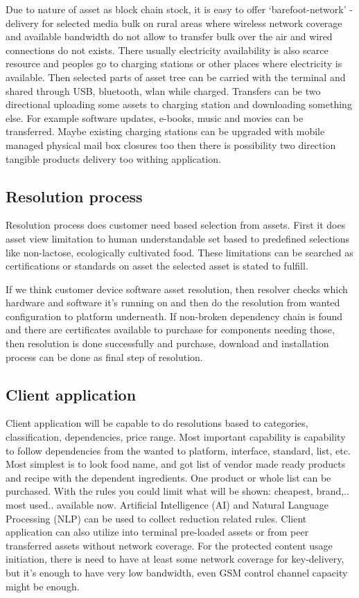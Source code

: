 Due to nature of asset as block chain stock, it is easy to offer
`barefoot-network' -delivery for selected media bulk on rural areas where
wireless network coverage and available bandwidth do not allow to transfer
bulk over the air and wired connections do not exists. There usually
electricity availability is also scarce resource and peoples go to charging
stations or other places where electricity is available. Then selected parts
of asset tree can be carried with the terminal and shared through USB,
bluetooth, wlan while charged. Transfers can be two directional uploading some
assets to charging station and downloading something else. For example
software updates, e-books, music and movies can be transferred. Maybe existing
charging stations can be upgraded with mobile managed physical mail box
closures too then there is possibility two direction tangible products
delivery too withing application.

\subsection{Resolution process}\label{resolution}
Resolution process does customer need based selection from assets. First it
does asset view limitation to human understandable set based to predefined
selections like non-lactose, ecologically cultivated food. These limitations
can be searched as certifications or standards on asset the selected asset is
stated to fulfill.  

If we think customer device software asset resolution, then resolver checks
which hardware and software it's running on and then do the resolution from
wanted configuration to platform underneath. If non-broken dependency chain is
found and there are certificates available to purchase for components needing
those, then resolution is done successfully and purchase, download and
installation process can be done as final step of resolution.  

\subsection{Client application}\label{client_application}
Client application will be capable to do resolutions based to categories,
classification, dependencies, price range. Most important capability is
capability to follow dependencies from the wanted to platform, interface,
standard, list, etc. Most simplest is to look food name, and got list of
vendor made ready products and recipe with the dependent ingredients. One
product or whole list can be purchased. With the rules you could limit what
will be shown: cheapest, brand,.. most used.. available now. Artificial
Intelligence (AI) and Natural Language Processing (NLP) can be used to
collect reduction related rules\allowbreak\cite{Creoir}\allowbreak\cite{
AIGFNorthern}. Client application can also utilize into terminal pre-loaded
assets or from peer transferred assets without network coverage. For the
protected content usage initiation, there is need to have at least some
network coverage for key-delivery, but it's enough to have very low
bandwidth, even GSM control channel capacity might be enough.

